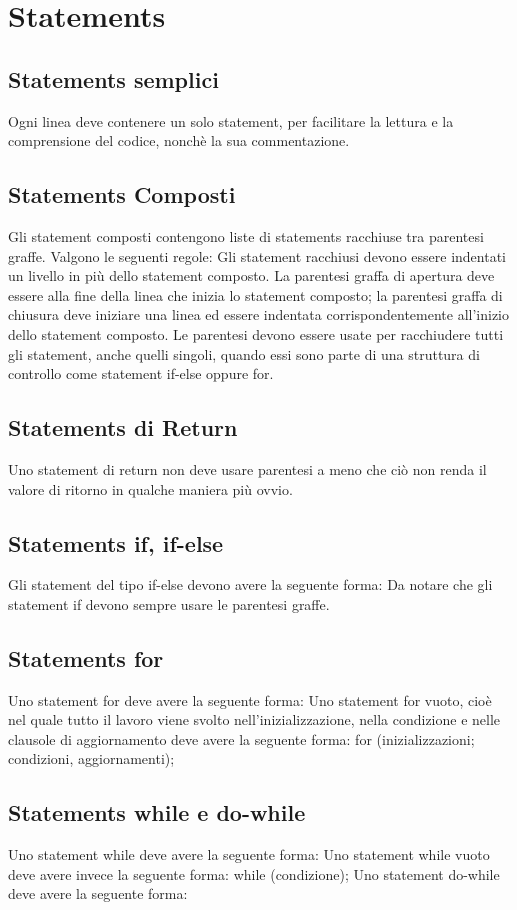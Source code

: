 \documentclass[11pt,titlepage,a4paper]{report}
\begin{document}
\section{Statements}
\subsection{Statements semplici}
Ogni linea deve contenere un solo statement, per facilitare la lettura e la comprensione del codice, nonch\`e la sua commentazione.
\subsection{Statements Composti}
  Gli statement composti contengono liste di statements racchiuse tra parentesi graffe.
  Valgono le seguenti regole:
Gli statement racchiusi devono essere indentati un livello in più dello statement
  composto.
La parentesi graffa di apertura deve essere alla fine della linea che inizia lo statement
  composto; la parentesi graffa di chiusura deve iniziare una linea ed essere indentata
  corrispondentemente all'inizio dello statement composto.
Le parentesi devono essere usate per racchiudere tutti gli statement, anche quelli
  singoli, quando essi sono parte di una struttura di controllo come statement if-else
  oppure for.
\subsection{Statements di Return}
   Uno statement di return non deve usare parentesi a meno che ciò non renda il valore di
ritorno in qualche maniera più ovvio.
\subsection{Statements if, if-else}
Gli statement del tipo if-else devono avere la seguente forma:
Da notare che gli statement if devono sempre usare le parentesi graffe.
\subsection{Statements for}
  Uno statement for deve avere la seguente forma:
  Uno statement for vuoto, cioè nel quale tutto il lavoro viene svolto nell'inizializzazione,
nella condizione e nelle clausole di aggiornamento deve avere la seguente forma:
  for (inizializzazioni; condizioni, aggiornamenti);
\subsection{Statements while e do-while}
Uno statement while deve avere la seguente forma:
Uno statement while vuoto deve avere invece la seguente forma:
while (condizione);
Uno statement do-while deve avere la seguente forma:
\end{document}
